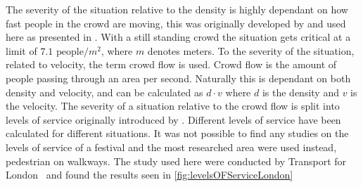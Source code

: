The severity of the situation relative to the density is highly dependant on how fast people in the crowd are moving, this was originally developed by \citet{crowdDistasters} and used here as presented in \citet{wirz2013probing}. With a still standing crowd the situation gets critical at a limit of $7.1 \text{ people} / m^2$, where $m$ denotes meters. To  the severity of the situation, related to velocity, the term crowd flow is used. Crowd flow is the amount of people passing through an area per second. Naturally this is dependant on both density and velocity, and can be calculated as ${d} \cdot {v}$ where $d$ is the density and $v$ is the velocity. The severity of a situation relative to the crowd flow is split into levels of service originally introduced by . Different levels of service have been calculated for different situations. It was not possible to find any studies on the levels of service of a festival and the most researched area were used instead, pedestrian on walkways. The study used here were conducted by Transport for London~\cite{levelsOfServiceLondon} and found the results seen in \cref{fig:levelsOFServiceLondon}

